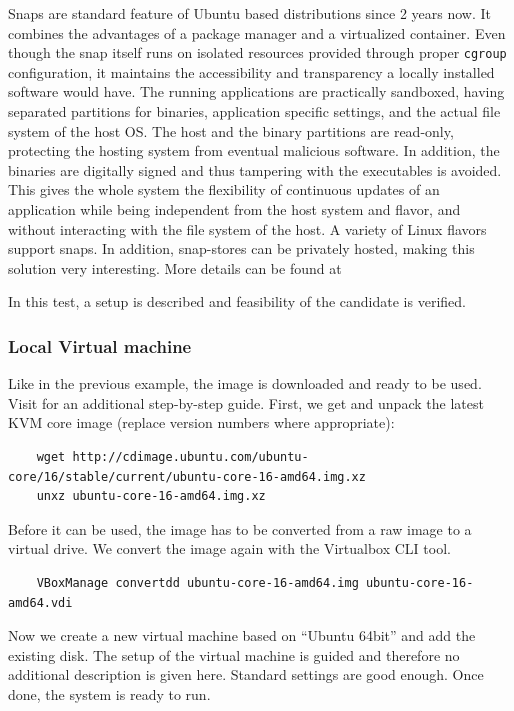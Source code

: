 \documentclass[]{scrartcl}
\begin{document}
Snaps are standard feature of Ubuntu based distributions since 2 years now. It combines the advantages of a package manager and a virtualized container. Even though the snap itself runs on isolated resources provided through proper \texttt{cgroup} configuration, it maintains the accessibility and transparency a locally installed software would have. The running applications are practically sandboxed, having separated partitions for binaries, application specific settings, and the actual file system of the host OS. The host and the binary partitions are read-only, protecting the hosting system from eventual malicious software. In addition, the binaries are digitally signed and thus tampering with the executables is avoided. This gives the whole system the flexibility of continuous updates of an application while being independent from the host system and flavor, and without interacting with the file system of the host.
A variety of Linux flavors support snaps. In addition, snap-stores can be privately hosted, making this solution very interesting. More details can be found at \cite{snap01}

In this test, a setup is described and feasibility of the candidate is verified.

\subsubsection{Local Virtual machine}

Like in the previous example, the image is downloaded and ready to be used. Visit \cite{ubuntu01} for an additional step-by-step guide.
First, we get and unpack the latest KVM core image (replace version numbers where appropriate):

\begin{verbatim}
	wget http://cdimage.ubuntu.com/ubuntu-core/16/stable/current/ubuntu-core-16-amd64.img.xz
	unxz ubuntu-core-16-amd64.img.xz
\end{verbatim}

Before it can be used, the image has to be converted from a raw image to a virtual drive. We convert the image again with the Virtualbox CLI tool.

\begin{verbatim}
	VBoxManage convertdd ubuntu-core-16-amd64.img ubuntu-core-16-amd64.vdi
\end{verbatim}

Now we create a new virtual machine based on ``Ubuntu 64bit'' and add the existing disk. The setup of the virtual machine is guided and therefore no additional description is given here. Standard settings are good enough. Once done, the system is ready to run.
\end{document}
